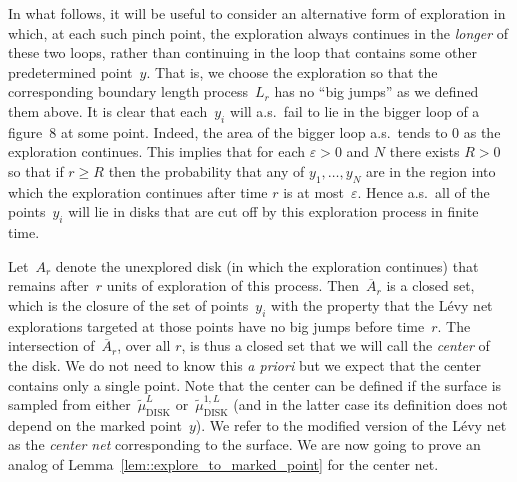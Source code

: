 \documentclass[JEP,XML,SOM,Unicode]{cedram}
\let\epsilon\varepsilon
\theoremstyle{plain}
\numberwithin{theorem}{section}
\theoremstyle{definition}
\newcommand{\tmudonel}{\wt{\mu}_{ \mathrm{DISK}}^{1, L}}
\newcommand{\tmudl}{\wt{\mu}_{\mathrm{DISK}}^L}
\let\ol\overline
\let\wt\widetilde
\begin{document}
In what follows, it will be useful to consider an alternative form of exploration in which, at each such pinch point, the exploration always continues in the \emph{longer} of these two loops, rather than continuing in the loop that contains some other predetermined point~$y$. That is, we choose the exploration so that the corresponding boundary length process~$L_r$ has no ``big jumps'' as we defined them above. It is clear that each~$y_i$ will a.s.\ fail to lie in the bigger loop of a figure~$8$ at some point. Indeed, the area of the bigger loop a.s.\ tends to $0$ as the exploration continues. This implies that for each $\epsilon > 0$ and $N$ there exists $R > 0$ so that if $r \geq R$ then the probability that any of $y_1,\ldots,y_N$ are in the region into which the exploration continues after time $r$ is at most~$\epsilon$. Hence a.s.\ all of the points~$y_i$ will lie in disks that are cut off by this exploration process in finite time.

Let~$A_r$ denote the unexplored disk (in which the exploration continues) that remains after~$r$ units of exploration of this process. Then~$\ol{A}_r$ is a closed set, which is the closure of the set of points~$y_i$ with the property that the Lévy net explorations targeted at those points have no big jumps before time~$r$. The intersection of~$\ol{A}_r$, over all $r$, is thus a closed set that we will call the \emph{center} of the disk. We do not need to know this \emph{a priori} but we expect that the center contains only a single point. Note that the center can be defined if the surface is sampled from either~$\tmudl$ or~$\tmudonel$ (and in the latter case its definition does not depend on the marked point~$y$). We refer to the modified version of the Lévy net as the \emph{center net} corresponding to the surface. We are now going to prove an analog of Lemma~\ref{lem::explore_to_marked_point} for the center net.
\end{document}

